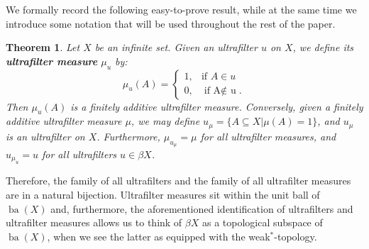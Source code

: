 \documentclass{jloganal}
\newtheorem{thm}{Theorem}[section]    %
\newtheorem{lem}[thm]{Lemma}          %
\theoremstyle{definition}
\newcommand{\ba}{\mathop{\mathrm{ba}}}
\begin{document}
We formally record the following easy-to-prove result, while at the same time we introduce some notation that will be used throughout the rest of the paper.

\begin{thm}
    Let $X$ be an infinite set. Given an ultrafilter $u$ on $X$, we define its {\bf ultrafilter measure} $\mu_u$ by:
\[
\mu_{u}(A)=\begin{cases}
			1, & \text{if $A\in u$ }\\
            0, & \text{if A$\notin$ u}.
		 \end{cases}
\]
Then $\mu_u(A)$ is a finitely additive ultrafilter measure. Conversely, given a finitely additive ultrafilter measure $\mu$, we may define $u_\mu=\{A\subseteq X\big|\mu(A)=1\}$, and $u_\mu$ is an ultrafilter on $X$. Furthermore, $\mu_{u_\mu}=\mu$ for all ultrafilter measures, and $u_{\mu_u}=u$ for all ultrafilters $u\in\beta X$.
\end{thm}

Therefore, the family of all ultrafilters and the family of all ultrafilter measures are in a natural bijection. Ultrafilter measures sit within the unit ball of $\ba(X)$ and, furthermore, the aforementioned identification of ultrafilters and ultrafilter measures allows us to think of $\beta X$ as a topological subspace of $\ba(X)$, when we see the latter as equipped with the weak$^*$-topology.


\end{document}
